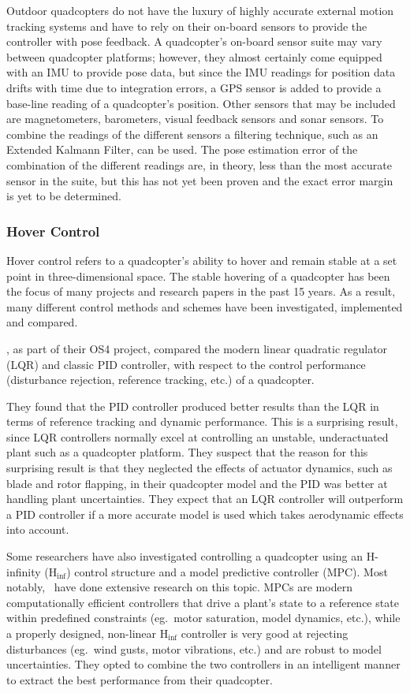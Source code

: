 Outdoor quadcopters do not have the luxury of highly accurate external motion tracking systems and have to rely on their on-board sensors to provide the controller with pose feedback. A quadcopter's on-board sensor suite may vary between quadcopter platforms; however, they almost certainly come equipped with an IMU to provide pose data, but since the IMU readings for position data drifts with time due to integration errors, a GPS sensor is added to provide a base-line reading of a quadcopter's position. Other sensors that may be included are magnetometers, barometers, visual feedback sensors and sonar sensors. To combine the readings of the different sensors a filtering technique, such as an Extended Kalmann Filter, can be used. The pose estimation error of the combination of the different readings are, in theory, less than the most accurate sensor in the suite, but this has not yet been proven and the exact error margin is yet to be determined. 

\subsubsection*{Hover Control}

Hover control refers to a quadcopter's ability to hover and remain stable at a set point in three-dimensional space. The stable hovering of a quadcopter has been the focus of many projects and research papers in the past 15 years. As a result, many different control methods and schemes have been investigated, implemented and compared. 

\cite{bouabdallah2004pid}, as part of their OS4 project, compared the modern linear quadratic regulator (LQR) and classic PID controller, with respect to the control performance (disturbance rejection, reference tracking, etc.) of a quadcopter.

They found that the PID controller produced better results than the LQR in terms of reference tracking and dynamic performance. This is a surprising result, since LQR controllers normally excel at controlling an unstable, underactuated plant such as a quadcopter platform. They suspect that the reason for this surprising result is that they neglected the effects of actuator dynamics, such as blade and rotor flapping, in their quadcopter model and the PID was better at handling plant uncertainties. They expect that an LQR controller will outperform a PID controller if a more accurate model is used which takes aerodynamic effects into account. 

Some researchers have also investigated controlling a quadcopter using an H-infinity (H$_{\inf}$) control structure and a model predictive controller (MPC). Most notably,~\cite{raffo2010integral} have done extensive research on this topic. MPCs are modern computationally efficient controllers that drive a plant's state to a reference state within predefined constraints (eg.\ motor saturation, model dynamics, etc.), while a properly designed, non-linear H$_{\inf}$ controller is very good at rejecting disturbances (eg.\ wind gusts, motor vibrations, etc.) and are robust to model uncertainties. They opted to combine the two controllers in an intelligent manner to extract the best performance from their quadcopter. 


